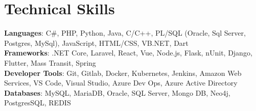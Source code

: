 \documentclass[letterpaper,11pt]{article}
\begin{document}
%
\section{Technical Skills}
 \begin{itemize}[leftmargin=0.15in, label={}]
    \small{\item{
     \textbf{Languages}{: C\#, PHP, Python, Java, C/C++, PL/SQL (Oracle, Sql Server, Postgres, MySql), JavaScript, HTML/CSS, VB.NET, Dart} \\
     \textbf{Frameworks}{: .NET Core, Laravel, React, Vue, Node.js, Flask, nUnit, Django, Flutter, Mass Transit, Spring} \\
     \textbf{Developer Tools}{: Git, Gitlab, Docker, Kubernetes, Jenkins, Amazon Web Services, VS Code, Visual Studio, Azure Dev Ops, Azure Active Directory} \\
     \textbf{Databases}{: MySQL, MariaDB, Oracle, SQL Server, Mongo DB, Neo4j, PostgresSQL, REDIS} \\
    }}
 \end{itemize}


\end{document}
